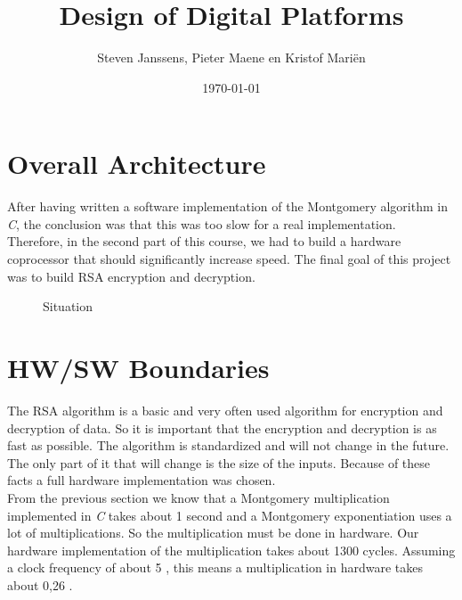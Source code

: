 \documentclass[a4paper]{article}
\title{Design of Digital Platforms}
\author{Steven Janssens, Pieter Maene en Kristof Mari\"en}
\date{\today}
\begin{document}
\maketitle

\section{Overall Architecture}

After having written a software implementation of the Montgomery algorithm in \textit{C}, the conclusion was that this was too slow for a real implementation. Therefore, in the second part of this course, we had to build a hardware coprocessor that should significantly increase speed. The final goal of this project was to build RSA encryption and decryption.\\

\begin{figure}[h]
	\caption{Situation}
	\label{fig:situation}
\end{figure}

\section{HW/SW Boundaries}

The RSA algorithm is a basic and very often used algorithm for encryption and decryption of data. So it is important that the encryption and decryption is as fast as possible. The algorithm is standardized and will not change in the future. The only part of it that will change is the size of the inputs. Because of these facts a full hardware implementation was chosen.\\

From the previous section we know that a Montgomery multiplication implemented in \textit{C} takes about 1 second and a Montgomery exponentiation uses a lot of multiplications. So the multiplication must be done in hardware. Our hardware implementation of the multiplication takes about 1300 cycles. Assuming a clock frequency of about 5 \mega \hertz, this means a multiplication in hardware takes about 0,26 \micro \second.\\
\end{document}
